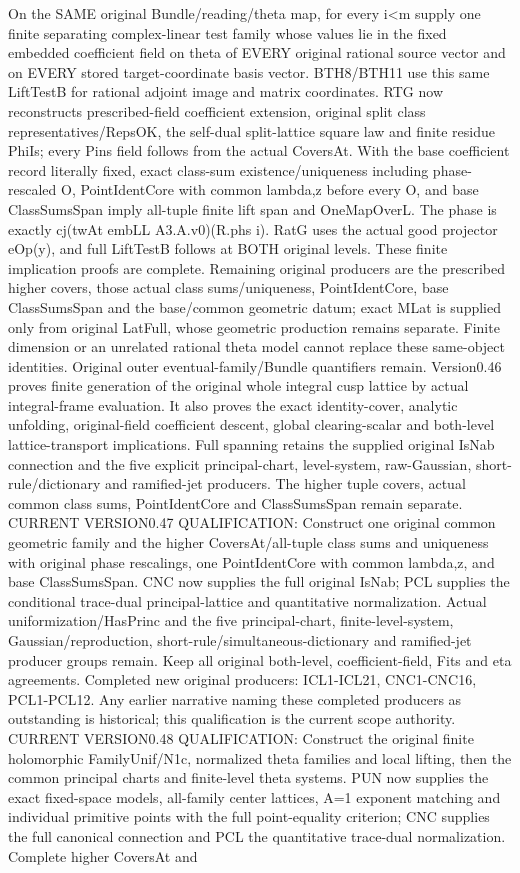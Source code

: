 \documentclass[11pt,a4paper]{article}
\numberwithin{equation}{section}
\theoremstyle{remark}\newtheorem{remark}[theorem]{Remark}
\begin{document}
On the SAME original Bundle/reading/theta map, for every i<m supply one finite separating complex-linear test family whose values lie in the fixed embedded coefficient field on theta of EVERY original rational source vector and on EVERY stored target-coordinate basis vector. BTH8/BTH11 use this same LiftTestB for rational adjoint image and matrix coordinates. RTG now reconstructs prescribed-field coefficient extension, original split class representatives/RepsOK, the self-dual split-lattice square law and finite residue PhiIs; every Pins field follows from the actual CoversAt. With the base coefficient record literally fixed, exact class-sum existence/uniqueness including phase-rescaled O, PointIdentCore with common lambda,z before every O, and base ClassSumsSpan imply all-tuple finite lift span and OneMapOverL. The phase is exactly cj(twAt embLL A3.A.v0)(R.phs i). RatG uses the actual good projector eOp(y), and full LiftTestB follows at BOTH original levels. These finite implication proofs are complete. Remaining original producers are the prescribed higher covers, those actual class sums/uniqueness, PointIdentCore, base ClassSumsSpan and the base/common geometric datum; exact MLat is supplied only from original LatFull, whose geometric production remains separate. Finite dimension or an unrelated rational theta model cannot replace these same-object identities. Original outer eventual-family/Bundle quantifiers remain. Version0.46 proves finite generation of the original whole integral cusp lattice by actual integral-frame evaluation. It also proves the exact identity-cover, analytic unfolding, original-field coefficient descent, global clearing-scalar and both-level lattice-transport implications. Full spanning retains the supplied original IsNab connection and the five explicit principal-chart, level-system, raw-Gaussian, short-rule/dictionary and ramified-jet producers. The higher tuple covers, actual common class sums, PointIdentCore and ClassSumsSpan remain separate. CURRENT VERSION0.47 QUALIFICATION: Construct one original common geometric family and the higher CoversAt/all-tuple class sums and uniqueness with original phase rescalings, one PointIdentCore with common lambda,z, and base ClassSumsSpan. CNC now supplies the full original IsNab; PCL supplies the conditional trace-dual principal-lattice and quantitative normalization. Actual uniformization/HasPrinc and the five principal-chart, finite-level-system, Gaussian/reproduction, short-rule/simultaneous-dictionary and ramified-jet producer groups remain. Keep all original both-level, coefficient-field, Fits and eta agreements. Completed new original producers: ICL1-ICL21, CNC1-CNC16, PCL1-PCL12. Any earlier narrative naming these completed producers as outstanding is historical; this qualification is the current scope authority. CURRENT VERSION0.48 QUALIFICATION: Construct the original finite holomorphic FamilyUnif/N1c, normalized theta families and local lifting, then the common principal charts and finite-level theta systems. PUN now supplies the exact fixed-space models, all-family center lattices, A=1 exponent matching and individual primitive points with the full point-equality criterion; CNC supplies the full canonical connection and PCL the quantitative trace-dual normalization. Complete higher CoversAt and 
\end{document}
